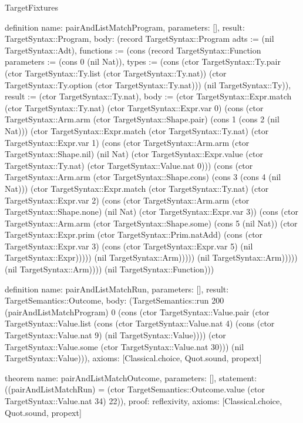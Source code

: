 \begin{lexlean}{TargetFixtures}
\begin{semanticmodule}
definition{
  name: pairAndListMatchProgram,
  parameters: [],
  result: TargetSyntax::Program,
  body: (record TargetSyntax::Program {adts := (nil TargetSyntax::Adt), functions := (cons (record TargetSyntax::Function {parameters := (cons 0 (nil Nat)), types := (cons (ctor TargetSyntax::Ty.pair (ctor TargetSyntax::Ty.list (ctor TargetSyntax::Ty.nat)) (ctor TargetSyntax::Ty.option (ctor TargetSyntax::Ty.nat))) (nil TargetSyntax::Ty)), result := (ctor TargetSyntax::Ty.nat), body := (ctor TargetSyntax::Expr.match (ctor TargetSyntax::Ty.nat) (ctor TargetSyntax::Expr.var 0) (cons (ctor TargetSyntax::Arm.arm (ctor TargetSyntax::Shape.pair) (cons 1 (cons 2 (nil Nat))) (ctor TargetSyntax::Expr.match (ctor TargetSyntax::Ty.nat) (ctor TargetSyntax::Expr.var 1) (cons (ctor TargetSyntax::Arm.arm (ctor TargetSyntax::Shape.nil) (nil Nat) (ctor TargetSyntax::Expr.value (ctor TargetSyntax::Ty.nat) (ctor TargetSyntax::Value.nat 0))) (cons (ctor TargetSyntax::Arm.arm (ctor TargetSyntax::Shape.cons) (cons 3 (cons 4 (nil Nat))) (ctor TargetSyntax::Expr.match (ctor TargetSyntax::Ty.nat) (ctor TargetSyntax::Expr.var 2) (cons (ctor TargetSyntax::Arm.arm (ctor TargetSyntax::Shape.none) (nil Nat) (ctor TargetSyntax::Expr.var 3)) (cons (ctor TargetSyntax::Arm.arm (ctor TargetSyntax::Shape.some) (cons 5 (nil Nat)) (ctor TargetSyntax::Expr.prim (ctor TargetSyntax::Prim.natAdd) (cons (ctor TargetSyntax::Expr.var 3) (cons (ctor TargetSyntax::Expr.var 5) (nil TargetSyntax::Expr))))) (nil TargetSyntax::Arm))))) (nil TargetSyntax::Arm))))) (nil TargetSyntax::Arm)))}) (nil TargetSyntax::Function))})
}

definition{
  name: pairAndListMatchRun,
  parameters: [],
  result: TargetSemantics::Outcome,
  body: (TargetSemantics::run 200 (pairAndListMatchProgram) 0 (cons (ctor TargetSyntax::Value.pair (ctor TargetSyntax::Value.list (cons (ctor TargetSyntax::Value.nat 4) (cons (ctor TargetSyntax::Value.nat 9) (nil TargetSyntax::Value)))) (ctor TargetSyntax::Value.some (ctor TargetSyntax::Value.nat 30))) (nil TargetSyntax::Value))),
  axioms: [Classical.choice, Quot.sound, propext]
}

theorem{
  name: pairAndListMatchOutcome,
  parameters: [],
  statement: ((pairAndListMatchRun) = (ctor TargetSemantics::Outcome.value (ctor TargetSyntax::Value.nat 34) 22)),
  proof: reflexivity{},
  axioms: [Classical.choice, Quot.sound, propext]
}


\end{semanticmodule}
\end{lexlean}
